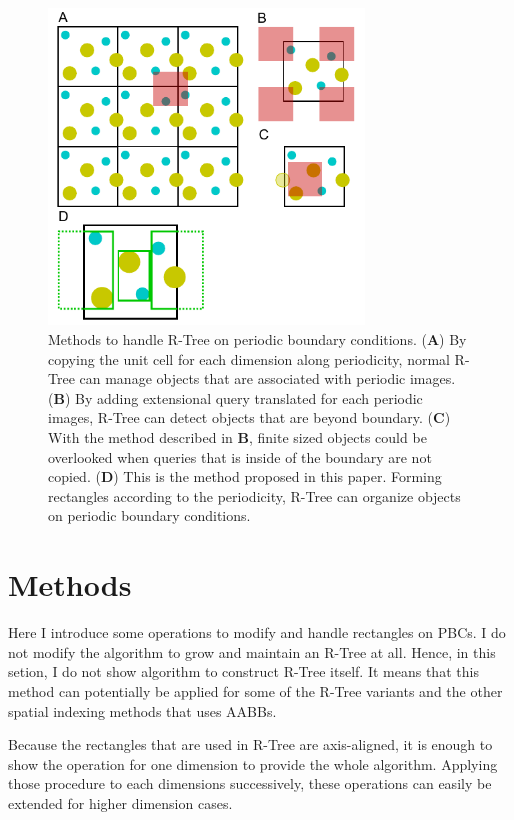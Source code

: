 \documentclass[10pt,letterpaper,twocolumn]{article}
\begin{document}
\begin{figure}[hbt]
    \includegraphics[width=8.4cm, bb=6 3 220 224]{fig1.eps}
    \caption{Methods to handle R-Tree on periodic boundary conditions.
    (\textbf{A})
    By copying the unit cell for each dimension along periodicity, normal R-Tree
    can manage objects that are associated with periodic images.
    (\textbf{B})
    By adding extensional query translated for each periodic images, R-Tree can
    detect objects that are beyond boundary.
    (\textbf{C})
    With the method described in \textbf{B}, finite sized objects could be
    overlooked when queries that is inside of the boundary are not copied.
    (\textbf{D})
    This is the method proposed in this paper. Forming rectangles according to
    the periodicity, R-Tree can organize objects on periodic boundary
    conditions.}
    \label{fig-method-rtree-pbc}
\end{figure}

\section*{Methods}

Here I introduce some operations to modify and handle rectangles on PBCs.
I do not modify the algorithm to grow and maintain an R-Tree at all.
Hence, in this setion, I do not show algorithm to construct R-Tree itself.
It means that this method can potentially be applied for some of the R-Tree
variants and the other spatial indexing methods that uses AABBs.

Because the rectangles that are used in R-Tree are axis-aligned, it is
enough to show the operation for one dimension to provide the whole algorithm.
Applying those procedure to each dimensions successively, these operations can
easily be extended for higher dimension cases.
\end{document}
